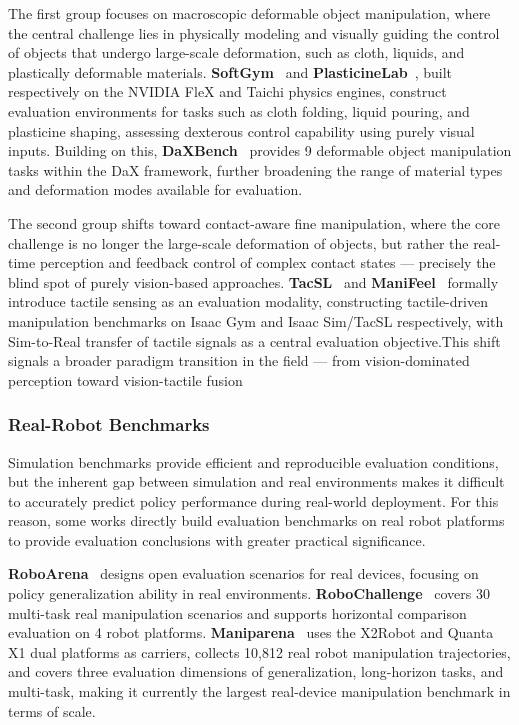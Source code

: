 The first group focuses on macroscopic deformable object manipulation, where the central challenge lies in physically modeling and visually guiding the control of objects that undergo large-scale deformation, such as cloth, liquids, and plastically deformable materials. \textbf{SoftGym}~\cite{lin2021softgym} and \textbf{PlasticineLab}~\cite{huang2021plasticinelab}, built respectively on the NVIDIA FleX and Taichi physics engines, construct evaluation environments for tasks such as cloth folding, liquid pouring, and plasticine shaping, assessing dexterous control capability using purely visual inputs. Building on this, \textbf{DaXBench}~\cite{chen2023daxbench} provides 9 deformable object manipulation tasks within the DaX framework, further broadening the range of material types and deformation modes available for evaluation.

The second group shifts toward contact-aware fine manipulation, where the core challenge is no longer the large-scale deformation of objects, but rather the real-time perception and feedback control of complex contact states — precisely the blind spot of purely vision-based approaches. \textbf{TacSL}~\cite{akinola2024tacsl} and \textbf{ManiFeel}~\cite{xu2025manifeel} formally introduce tactile sensing as an evaluation modality, constructing tactile-driven manipulation benchmarks on Isaac Gym and Isaac Sim/TacSL respectively, with Sim-to-Real transfer of tactile signals as a central evaluation objective.This shift signals a broader paradigm transition in the field — from vision-dominated perception toward vision-tactile fusion

\subsubsection{Real-Robot Benchmarks}
\label{sec:bench_real}
Simulation benchmarks provide efficient and reproducible evaluation conditions, but the
inherent gap between simulation and real environments makes it difficult to accurately
predict policy performance during real-world deployment. For this reason, some works
directly build evaluation benchmarks on real robot platforms to provide evaluation
conclusions with greater practical significance.

\textbf{RoboArena}~\cite{atreya2025roboarena} designs open evaluation scenarios for real
devices, focusing on policy generalization ability in real environments.
\textbf{RoboChallenge}~\cite{yakefu2025robochallenge} covers 30 multi-task real
manipulation scenarios and supports horizontal comparison evaluation on 4 robot platforms.
\textbf{Maniparena}~\cite{sun2026maniparena} uses the X2Robot and Quanta X1 dual platforms
as carriers, collects 10,812 real robot manipulation trajectories, and covers three
evaluation dimensions of generalization, long-horizon tasks, and multi-task, making it
currently the largest real-device manipulation benchmark in terms of scale. 
